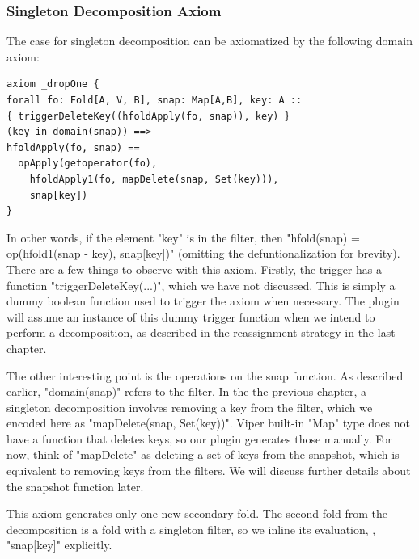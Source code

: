 \documentclass[msc,oneside]{ubcthesis}
\theoremstyle{definition}
\begin{document}
\subsubsection{Singleton Decomposition Axiom}
The case for singleton decomposition can be axiomatized by the following domain axiom:
\begin{lstlisting}[label=axm:drpone,caption=Decomposition By Removing 1 Element]
axiom _dropOne {
forall fo: Fold[A, V, B], snap: Map[A,B], key: A ::
{ triggerDeleteKey((hfoldApply(fo, snap)), key) }
(key in domain(snap)) ==>
hfoldApply(fo, snap) == 
  opApply(getoperator(fo), 
    hfoldApply1(fo, mapDelete(snap, Set(key))), 
    snap[key])
}
\end{lstlisting}
In other words, if the element "key" is in the filter, then "hfold(snap) = op(hfold1(snap - key), snap[key])" (omitting the defuntionalization for brevity). There are a few things to observe with this axiom. Firstly, the trigger has a function "triggerDeleteKey(...)", which we have not discussed. This is simply a dummy boolean function used to trigger the axiom when necessary. The plugin will assume an instance of this dummy trigger function when we intend to perform a decomposition, as described in the reassignment strategy in the last chapter.

The other interesting point is the operations on the snap function. As described earlier, "domain(snap)" refers to the filter. In the the previous chapter, a singleton decomposition involves removing a key from the filter, which we encoded here as "mapDelete(snap, Set(key))". Viper built-in "Map" type does not have a function that deletes keys, so our plugin generates those manually. For now, think of "mapDelete" as deleting a set of keys from the snapshot, which is equivalent to removing keys from the filters. We will discuss further details about the snapshot function later.

This axiom generates only one new secondary fold. The second fold from the decomposition is a fold with a singleton filter, so we inline its evaluation, \ie, "snap[key]" explicitly.
\end{document}
